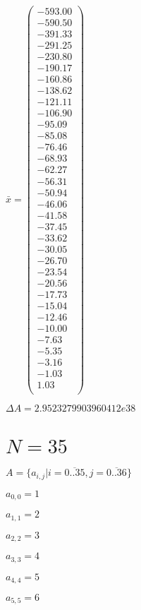 \documentclass[a4paper,12pt]{article}
\begin{document}
$\bar { x } = \begin{pmatrix}
-593.00 \\
-590.50 \\
-391.33 \\
-291.25 \\
-230.80 \\
-190.17 \\
-160.86 \\
-138.62 \\
-121.11 \\
-106.90 \\
-95.09 \\
-85.08 \\
-76.46 \\
-68.93 \\
-62.27 \\
-56.31 \\
-50.94 \\
-46.06 \\
-41.58 \\
-37.45 \\
-33.62 \\
-30.05 \\
-26.70 \\
-23.54 \\
-20.56 \\
-17.73 \\
-15.04 \\
-12.46 \\
-10.00 \\
-7.63 \\
-5.35 \\
-3.16 \\
-1.03 \\
1.03 \\
\end{pmatrix}
$

$\Delta A = 2.9523279903960412e38$



\section{ $N = 35$ }
$A = \{ a _{ i, j } | i = \overline { 0..35 }, j = \overline { 0..36 } \}$

$a _{ 0, 0 } = 1$

$a _{ 1, 1 } = 2$

$a _{ 2, 2 } = 3$

$a _{ 3, 3 } = 4$

$a _{ 4, 4 } = 5$

$a _{ 5, 5 } = 6$
\end{document}
